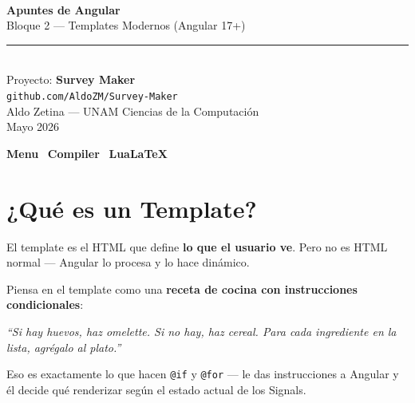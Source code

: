 \documentclass[12pt, a4paper]{article}
\begin{document}
\begin{titlepage}
  \centering
  \vspace*{2.5cm}
  {\fontsize{48}{48}\selectfont {}}\\[0.4cm]
  {\Huge\bfseries\color{azulSignal} Apuntes de Angular}\\[0.4cm]
  {\Large\color{grisCodigo} Bloque 2 --- Templates Modernos (Angular 17+)}\\[0.8cm]
  \textcolor{gray!60}{\rule{10cm}{0.8pt}}\\[0.8cm]
  {\large Proyecto: \textbf{Survey Maker}}\\[0.2cm]
  {\normalsize\texttt{\textcolor{morado}{github.com/AldoZM/Survey-Maker}}}\\[0.8cm]
  {\normalsize {} Aldo Zetina --- UNAM Ciencias de la Computación}\\[0.2cm]
  {\normalsize {} Mayo 2026}\\[2cm]
  \begin{tcolorbox}[importante, title={\emoji{wrench} Compilar en Overleaf}]
    \textbf{Menu} \textrightarrow\ \textbf{Compiler} \textrightarrow\ \textbf{LuaLaTeX}
  \end{tcolorbox}
\end{titlepage}

\tableofcontents
\newpage

\section{ ¿Qué es un Template?}

El template es el HTML que define \textbf{lo que el usuario ve}.
Pero no es HTML normal --- Angular lo procesa y lo hace dinámico.

\begin{tcolorbox}[analogia, title={\emoji{cook} La Receta con Instrucciones}]
Piensa en el template como una \textbf{receta de cocina con instrucciones condicionales}:

\textit{``Si hay huevos, haz omelette. Si no hay, haz cereal.
Para cada ingrediente en la lista, agrégalo al plato.''}

Eso es exactamente lo que hacen \texttt{@if} y \texttt{@for} ---
le das instrucciones a Angular y él decide qué renderizar
según el estado actual de los Signals.
\end{tcolorbox}
\end{document}
